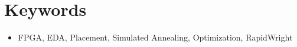 \section{Keywords}
\begin{itemize}
\item FPGA, EDA, Placement, Simulated Annealing, Optimization, RapidWright
\end{itemize}
